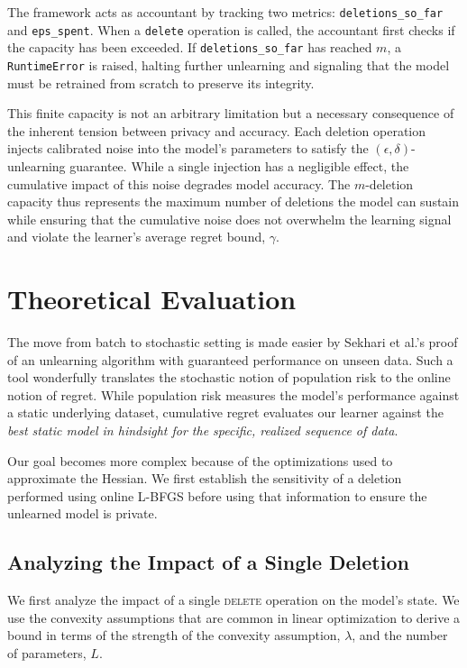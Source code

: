 \documentclass[a4paper,12pt]{article}
\begin{document}
The framework acts as accountant by tracking two metrics: \texttt{deletions\_so\_far} and \texttt{eps\_spent}. When a \texttt{delete} operation is called, the accountant first checks if the capacity has been exceeded. If \texttt{deletions\_so\_far} has reached $m$, a \texttt{RuntimeError} is raised, halting further unlearning and signaling that the model must be retrained from scratch to preserve its integrity.

This finite capacity is not an arbitrary limitation but a necessary consequence of the inherent tension between privacy and accuracy. Each deletion operation injects calibrated noise into the model's parameters to satisfy the $(\epsilon, \delta)$-unlearning guarantee. While a single injection has a negligible effect, the cumulative impact of this noise degrades model accuracy. The $m$-deletion capacity thus represents the maximum number of deletions the model can sustain while ensuring that the cumulative noise does not overwhelm the learning signal and violate the learner's average regret bound, $\gamma$.

\section{Theoretical Evaluation}

The move from batch to stochastic setting is made easier by Sekhari et al.'s  proof of an unlearning algorithm with guaranteed performance on unseen data. Such a tool wonderfully translates the stochastic notion of population risk to the online notion of regret. While population risk measures the model's performance against a static underlying dataset, cumulative regret evaluates our learner against the \textit{best static model in hindsight for the specific, realized sequence of data}.

Our goal becomes more complex because of the optimizations used to approximate the Hessian. We first establish the sensitivity of a deletion performed using online L-BFGS before using that information to ensure the unlearned model is private.

\subsection{Analyzing the Impact of a Single Deletion}

We first analyze the impact of a single \textsc{delete} operation on the model's state. We use the convexity assumptions that are common in linear optimization to derive a bound in terms of the strength of the convexity assumption, $\lambda$, and the number of parameters, $L$.
\end{document}
